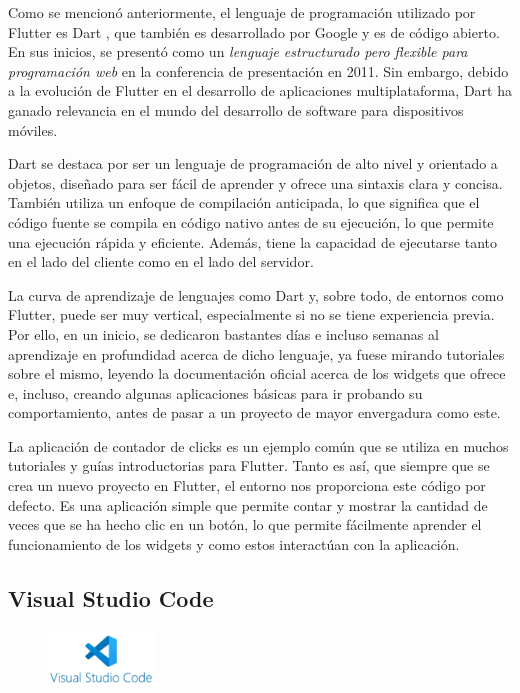 \documentclass{article}
\begin{document}
Como se mencionó anteriormente, el lenguaje de programación utilizado por Flutter es Dart \cite{Dart}, que también es desarrollado por Google y es de código abierto. En sus inicios, se presentó como un \textit{lenguaje estructurado pero flexible para programación web} en la conferencia de presentación en 2011. Sin embargo, debido a la evolución de Flutter en el desarrollo de aplicaciones multiplataforma, Dart ha ganado relevancia en el mundo del desarrollo de software para dispositivos móviles.

Dart se destaca por ser un lenguaje de programación de alto nivel y orientado a objetos, diseñado para ser fácil de aprender y ofrece una sintaxis clara y concisa. También utiliza un enfoque de compilación anticipada, lo que significa que el código fuente se compila en código nativo antes de su ejecución, lo que permite una ejecución rápida y eficiente. Además, tiene la capacidad de ejecutarse tanto en el lado del cliente como en el lado del servidor.

La curva de aprendizaje de lenguajes como Dart y, sobre todo, de entornos como Flutter, puede ser muy vertical, especialmente si no se tiene experiencia previa. Por ello, en un inicio, se dedicaron bastantes días e incluso semanas al aprendizaje en profundidad acerca de dicho lenguaje, ya fuese mirando tutoriales sobre el mismo, leyendo la documentación oficial acerca de los widgets que ofrece e, incluso, creando algunas aplicaciones básicas para ir probando su comportamiento, antes de pasar a un proyecto de mayor envergadura como este.

La aplicación de contador de clicks es un ejemplo común que se utiliza en muchos tutoriales y guías introductorias para Flutter. Tanto es así, que siempre que se crea un nuevo proyecto en Flutter, el entorno nos proporciona este código por defecto. Es una aplicación simple que permite contar y mostrar la cantidad de veces que se ha hecho clic en un botón, lo que permite fácilmente aprender el funcionamiento de los widgets y como estos interactúan con la aplicación.

\subsection{Visual Studio Code}

\begin{figure}[h]
    \centering
    \includegraphics[width=0.25\textwidth]{imagenes/logos/logo_vscode.png}
\end{figure}
\end{document}
